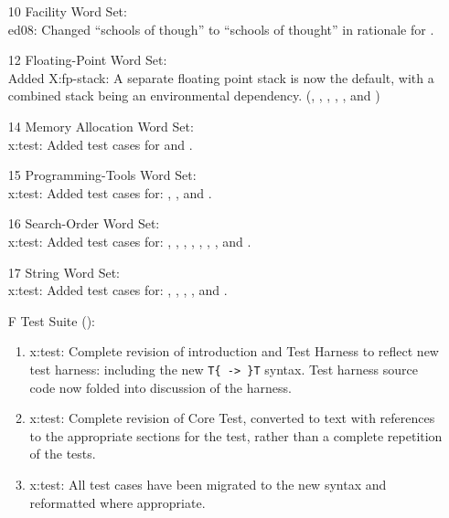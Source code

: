 \begin{itemize}
	\item[10] Facility Word Set: \\
		\textsf{ed08}: Changed ``schools of though'' to ``schools of
			thought'' in rationale for .

	\item[12] Floating-Point Word Set: \\
		Added \textsf{X:fp-stack}:
		A separate floating point stack is now the default,
		with a combined stack being an environmental
		dependency.
		(,
		 ,
		 ,
		 ,
		 , and
		 )

	\item[14] Memory Allocation Word Set: \\
		\textsf{x:test}: Added test cases for
		 and .

	\item[15] Programming-Tools Word Set: \\
		\textsf{x:test}: Added test cases for:
			,
			,
			 and
			.

	\item[16] Search-Order Word Set: \\
		\textsf{x:test}: Added test cases for:
		,
		,
		,
		,
		,
		,
		,
		 and
		.

	\item[17] String Word Set: \\
		\textsf{x:test}: Added test cases for:
		,
		,
		,
		,
		 and
		.

	\item[F] Test Suite ():
		\begin{enumerate}
		\item \textsf{x:test}: Complete revision of introduction and
			Test Harness to reflect new test harness: including
			the new \verb"T{ -> }T" syntax.  Test harness source
			code now folded into discussion of the harness.

		\item \textsf{x:test}: Complete revision of Core Test,
			converted to text with references to the appropriate
			sections for the test, rather than a complete repetition
			of the tests.

		\item \textsf{x:test}: All test cases have been migrated to the
			new syntax and reformatted where appropriate.
		\end{enumerate}
	\end{itemize}

